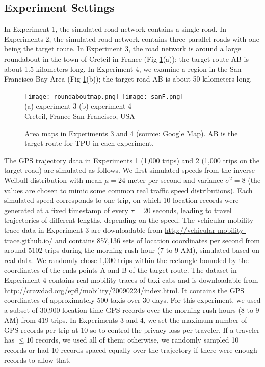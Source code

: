 \documentclass[10pt,journal,compsoc]{IEEEtran}
\begin{document}
\vspace{-9pt}\subsection{Experiment Settings}\label{sec:setting}\vspace{-3pt}
In Experiment 1, the simulated  road network contains a single road. In Experiments 2, the simulated  road network contains three parallel roads with one being the target route.  In Experiment 3, the road network is around a large  roundabout in the town of Creteil in France (Fig \ref{cologne}(a)); the target route AB is about 1.5 kilometers long. In Experiment 4, we examine a region in the San Francisco Bay Area (Fig \ref{cologne}(b)); the target road AB is about 50 kilometers long. 
\begin{figure}[!htb]
\texttt{[image: roundaboutmap.png]}
\texttt{[image: sanF.png]}\\
\centering (a) experiment 3 \hspace{0.7in} (b) experiment 4 \\
\centering\hspace{0.1in} Creteil, France  \hspace{0.7in}  San Francisco, USA\\
\vspace{-6pt}
\caption{Area maps in Experiments 3 and 4 (source: Google Map). AB is the target route for TPU in each experiment.} \label{cologne}
\end{figure} 

The GPS trajectory data in Experiments 1 (1,000 trips) and 2 (1,000 trips on the target road) are simulated as follows. We first simulated speeds from the inverse Weibull distribution with mean $\mu=24$ meter per second and variance $\sigma^2=8$ (the values are chosen to mimic some common real traffic speed distributions). Each simulated speed corresponds to one trip, on which 10 location records were generated at a fixed timestamp of every $\tau=20$ seconds, leading to travel trajectories of different lengths, depending on the speed. The vehicular mobility trace data in Experiment 3 \cite{vehicular} are  downloadable from \url{http://vehicular-mobility-trace.github.io/} and  contains 857,136  sets of location coordinates per second from around 5102 trips during the morning rush hour (7 to 9 AM), simulated based on real data. We randomly chose 1,000 trips within the rectangle bounded by the coordinates of the ends points A and B of the target route. The dataset in Experiment 4 \cite{sanf} contains real  mobility traces of taxi cabs and is downloadable from \url{http://crawdad.org/epfl/mobility/20090224/index.html}. It contains the GPS coordinates of approximately 500 taxis  over 30 days. For this experiment, we used a subset of 30,900 location-time GPS records over the morning  rush  hours (8 to 9 AM) from  419 trips.  In Experiments 3 and 4, we set the maximum number of GPS records per trip at 10 so to control the privacy loss per traveler. If a traveler has $\le10$ records, we used all of them; otherwise, we randomly sampled 10 records or  had  10 records spaced equally over the trajectory if there were enough records to allow that.
\end{document}
